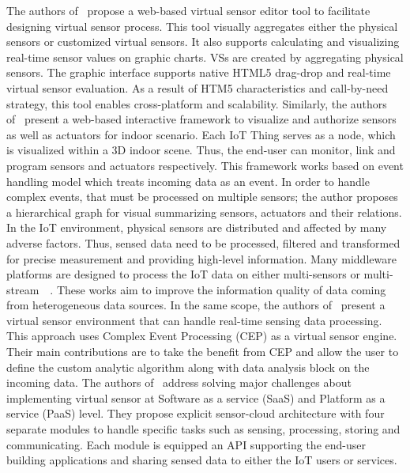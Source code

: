 The authors of~\cite{al2013} propose a web-based virtual sensor editor tool to facilitate designing virtual sensor process. This tool visually aggregates either the physical sensors or customized virtual sensors. It also supports calculating and visualizing real-time sensor values on graphic charts. VSs are created by aggregating physical sensors. The graphic interface supports native HTML5 drag-drop and real-time virtual sensor evaluation. As a result of HTM5 characteristics and call-by-need strategy, this tool enables cross-platform and scalability. Similarly, the authors of~\cite{JeongJooHongShinLee2015} present a web-based interactive framework to visualize and authorize sensors as well as actuators for indoor scenario. Each IoT Thing serves as a node, which is visualized within a 3D indoor scene. Thus, the end-user can monitor, link and program sensors and actuators respectively. This framework works based on event handling model which treats incoming data as an event. In order to handle complex events, that must be processed on multiple sensors; the author proposes a hierarchical graph for visual summarizing sensors, actuators and their relations. \\

In the IoT environment, physical sensors are distributed and affected by many adverse factors. Thus, sensed data need to be processed, filtered and transformed for precise measurement and providing high-level information. Many middleware platforms are designed to process the IoT data on either multi-sensors or multi-stream~\cite{Julien2014}~\cite{LHuFWangJZhouK2015}. These works aim to improve the information quality of data coming from heterogeneous data sources. In the same scope, the authors of~\cite{BrunelliGalloBenini2016} present a virtual sensor environment that can handle real-time sensing data processing. This approach uses Complex Event Processing (CEP) as a virtual sensor engine. Their main contributions are to take the benefit from CEP and allow the user to define the custom analytic algorithm along with data analysis block on the incoming data. The authors of~\cite{GuptaMukherjee2016} address solving major challenges about implementing virtual sensor at Software as a service (SaaS) and Platform as a service (PaaS) level. They propose explicit sensor-cloud architecture with four separate modules to handle specific tasks such as sensing, processing, storing and communicating. Each module is equipped an API supporting the end-user building applications and sharing sensed data to either the IoT users or services.\\

